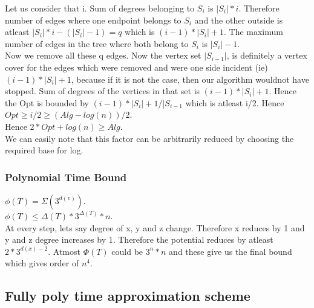 \documentclass[solution,addpoints,12pt]{exam}
\begin{document}
Let us consider that i. Sum of degrees belonging to $S_i$
is $|S_i|*i$. Therefore number of edges where one endpoint
belongs to $S_i$ and the other outside is atleast $|S_i|*i - (|S_i| - 1) = q$
which is $(i-1)*|S_i| + 1$. The maximum number of
edges in the tree where both belong to $S_i$ is $|S_i| - 1$.\\
Now we remove all these q edges. Now the vertex set $|S_{i-1}|$,
is definitely a vertex cover for the edges which were removed
and were one side incident (ie) $(i-1)*|S_i| + 1$,
because if it is not the case, then our algorithm wouldnot
have stopped. Sum of degrees of the vertices in that set
is $(i-1)*|S_i| + 1$. Hence the Opt is bounded
by $(i-1)*|S_i| + 1$/|$S_{i-1}$ which is atleast i/2.
Hence $Opt \ge i/2 \ge (Alg - log(n))/2$.\\
Hence $2*Opt + log(n) \ge Alg$.\\
We can easily note that this factor can be arbitrarily
reduced by choosing the required base for log.

\subsubsection{Polynomial Time Bound}
$\phi(T) = \Sigma(3^{d(v)})$.\\
$\phi(T) \le \Delta(T)*3^{\Delta(T)}*n$.\\
At every step, lets say degree of x, y and z change.
Therefore x reduces by 1 and y and z degree increases by 1.
Therefore the potential reduces by atleast $2*3^{d(x)-2}$.
Atmost $\Phi(T)$ could be $3^n*n$ and these give us the
final bound which gives order of $n^4$.

\subsection{Fully poly time approximation scheme}
\end{document}

